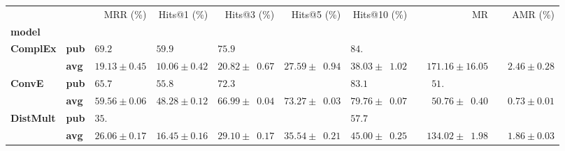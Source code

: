 \begin{tabular}{llrrrrrrr}
\toprule
       &     &                    MRR (\%) &                 Hits@1 (\%) &                            Hits@3 (\%) &                            Hits@5 (\%) &                           Hits@10 (\%) &                                        MR &                     AMR (\%) \\
\textbf{model} & {} &                             &                             &                                        &                                        &                                        &                                           &                              \\
\midrule
\textbf{ComplEx} & \textbf{pub} &  $69.2\phantom{0 \pm 0.00}$ &  $59.9\phantom{0 \pm 0.00}$ &            $75.9\phantom{0 \pm 00.00}$ &                                        &            $84.\phantom{00 \pm 00.00}$ &                                           &                              \\
       & \textbf{avg} &            $19.13 \pm 0.45$ &            $10.06 \pm 0.42$ &            $20.82 \pm \phantom{0}0.67$ &            $27.59 \pm \phantom{0}0.94$ &            $38.03 \pm \phantom{0}1.02$ &            $\phantom{00}171.16 \pm 16.05$ &  $\phantom{00}2.46 \pm 0.28$ \\
\textbf{ConvE} & \textbf{pub} &  $65.7\phantom{0 \pm 0.00}$ &  $55.8\phantom{0 \pm 0.00}$ &            $72.3\phantom{0 \pm 00.00}$ &                                        &            $83.1\phantom{0 \pm 00.00}$ &  $\phantom{000}51.\phantom{00 \pm 00.00}$ &                              \\
       & \textbf{avg} &            $59.56 \pm 0.06$ &            $48.28 \pm 0.12$ &            $66.99 \pm \phantom{0}0.04$ &            $73.27 \pm \phantom{0}0.03$ &            $79.76 \pm \phantom{0}0.07$ &  $\phantom{000}50.76 \pm \phantom{0}0.40$ &  $\phantom{00}0.73 \pm 0.01$ \\
\textbf{DistMult} & \textbf{pub} &  $35.\phantom{00 \pm 0.00}$ &                             &                                        &                                        &            $57.7\phantom{0 \pm 00.00}$ &                                           &                              \\
       & \textbf{avg} &            $26.06 \pm 0.17$ &            $16.45 \pm 0.16$ &            $29.10 \pm \phantom{0}0.17$ &            $35.54 \pm \phantom{0}0.21$ &            $45.00 \pm \phantom{0}0.25$ &  $\phantom{00}134.02 \pm \phantom{0}1.98$ &  $\phantom{00}1.86 \pm 0.03$ \\

\end{tabular}
